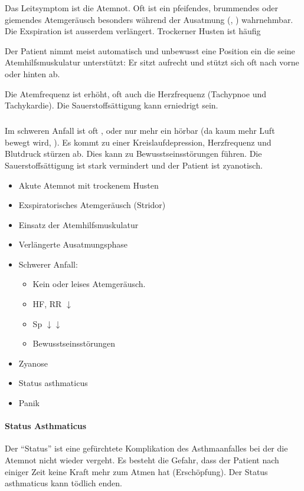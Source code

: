 {
Das Leitsymptom ist die Atemnot. Oft ist ein pfeifendes,
brummendes oder giemendes Atemgeräusch besonders während der
Ausatmung (, )
wahrnehmbar. Die Exspiration ist ausserdem verlängert. Trockerner Husten ist häufig

Der Patient nimmt meist automatisch und unbewusst eine
Position ein die seine Atemhilfsmuskulatur unterstützt: Er
sitzt aufrecht und stützt sich oft nach vorne oder hinten
ab. 

Die Atemfrequenz ist erhöht, oft auch die Herzfrequenz
(Tachypnoe und Tachykardie). Die Sauerstoffsättigung kann
erniedrigt sein. 

\subparagraph{}

Im schweren Anfall ist oft , oder nur mehr ein
 hörbar (da kaum mehr
Luft bewegt wird, ). Es kommt zu einer
Kreislaufdepression, Herzfrequenz und Blutdruck stürzen ab.
Dies kann zu Bewusstseinsstörungen führen. Die
Sauerstoffsättigung ist stark vermindert und der Patient ist zyanotisch.


}{
\begin{itemize}
  \item Akute Atemnot mit trockenem Husten
  \item Exspiratorisches Atemgeräusch (Stridor)
  \item Einsatz der Atemhilfsmuskulatur
  \item Verlängerte Ausatmungsphase
  \item Schwerer Anfall:
  \begin{itemize}
    \item Kein oder leises Atemgeräusch.
    \item HF, RR $\downarrow$
    \item Sp $\downarrow\downarrow$
    \item Bewusstseinsstörungen
  \end{itemize}
\end{itemize}
}
{}
{}
{}

{
\begin{itemize}
  \item Zyanose
  \item Status asthmaticus
  \item Panik
\end{itemize}
}{

}
{}
{}
{}


\paragraph{Status Asthmaticus}
\label{topic:status-asthmaticus}Der
"`Status"' ist eine gefürchtete Komplikation des
Asthmaanfalles bei der die Atemnot nicht wieder vergeht. Es
besteht die Gefahr, dass der Patient nach einiger Zeit keine
Kraft mehr zum Atmen hat (Erschöpfung). Der Status
asthmaticus kann tödlich enden.

